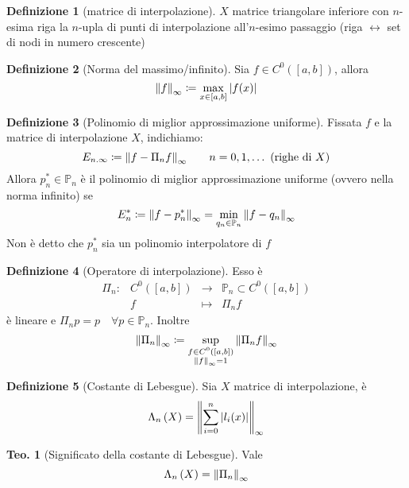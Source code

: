 \documentclass[a4paper,10pt]{article}
\theoremstyle{definition}
\theoremstyle{indentdefinition}
\newtheorem{defn}{Definizione}[section]
\theoremstyle{indenttheorem}
\newtheorem{thm}{Teo.}
\theoremstyle{myremark}
\theoremstyle{indentgeneral}
\theoremstyle{plain}
\theoremstyle{plain}
\newenvironment{myboxed} 
{\noindent\begin{lrbox}{\mybox}\begin{minipage}{\textwidth}}
{\end{minipage}\end{lrbox}\fbox{\usebox{\mybox}}}
\begin{document}
\begin{defn}[matrice di interpolazione]
\label{def:matrice-di-interpolazione}$X$ matrice triangolare inferiore
con $n$-esima riga la $n$-upla di punti di interpolazione all'$n$-esimo
passaggio (riga $\leftrightarrow$ set di nodi in numero crescente)
\end{defn}

\begin{defn}[Norma del massimo/infinito] Sia $f\in C^0([a,b])$, allora
$$\norm{f}_\infty\coloneqq\max_{x\in[a,b]}\abs{f(x)}$$
\end{defn}

\begin{defn}[Polinomio di miglior approssimazione uniforme] Fissata $f$ e la matrice di interpolazione $X$, indichiamo:
$$E_{n.\infty}\coloneqq\norm{f-\Pi_nf}_\infty\qquad n=0,1,\ldots \text{ (righe di $X$)}$$
Allora $p^*_n\in\mathbb{P}_n$ è il polinomio di miglior approssimazione uniforme (ovvero nella norma infinito) se
$$E^*_n\coloneqq\norm{f-p^*_n}_\infty=\min_{q_n\in\mathbb{P}_n}\norm{f-q_n}_\infty$$
    Non è detto che $p^*_n$ sia un polinomio interpolatore di $f$
\end{defn}

\begin{defn}[Operatore di interpolazione]
    Esso è
    $$\begin{array}{cccc}
        \Pi_n: & C^0([a,b]) & \to & \mathbb{P}_n\subset C^0([a,b])  \\
         & f & \mapsto & \Pi_nf
    \end{array}$$
    è lineare e $\Pi_np=p\quad\forall p\in\mathbb{P}_n$. Inoltre
    $$\norm{\Pi_n}_\infty\coloneqq\sup_{\substack{f\in C^0([a,b]) \\ \norm{f}_\infty=1 }}\norm{\Pi_nf}_\infty$$
\end{defn}



\begin{defn}[Costante di Lebesgue]
Sia $X$ matrice di interpolazione, è 
$$\Lambda_{n}\left(X\right)=\norm{\sum_{i=0}^{n}\abs{l_{i}(x)
}}_{\infty}$$
\end{defn}

\begin{myboxed}
    \begin{thm}[Significato della costante di Lebesgue]\label{thm-cost-lebesgue} Vale
$$\Lambda_{n}\left(X\right)=\norm{\Pi_n}_\infty$$
    \end{thm}
\end{myboxed}
\end{document}
